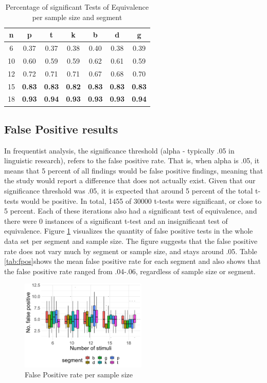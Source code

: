 \documentclass[
  a4paper,
  11pt,
  twocolumn]{article}
\begin{document}
\begin{table}[!ht]
  \caption{Percentage of significant Tests of Equivalence per sample size and segment}
  \label{tab:nums}
  \begin{center}
  \begin{tabular}{|c|c|c|c|c|c|c|}
  \hline
  \rowcolor[gray]{.75}
  n & p & t & k & b & d & g  \\
  \hline
  6 & 0.37 & 0.37 & 0.38 & 0.40 & 0.38 & 0.39 \\ 
  10 & 0.60 & 0.59 & 0.59 & 0.62 & 0.61 & 0.59 \\ 
  12 & 0.72 & 0.71 & 0.71 & 0.67 & 0.68 & 0.70 \\ 
  15 & \textbf{0.83} & \textbf{0.83} & \textbf{0.82} & \textbf{0.83} & \textbf{0.83} & \textbf{0.83} \\ 
  18 & \textbf{0.93} & \textbf{0.94} & \textbf{0.93} & \textbf{0.93} & \textbf{0.93} & \textbf{0.94} \\ 
  \hline
  \end{tabular}
  \end{center}
\end{table}

\subsection{False Positive results}

In frequentist analysis, the significance threshold (alpha - typically
.05 in linguistic research), refers to the false positive rate. That is,
when alpha is .05, it means that 5 percent of all findings would be
false positive findings, meaning that the study would report a
difference that does not actually exist. Given that our significance
threshold was .05, it is expected that around 5 percent of the total
t-tests would be positive. In total, 1455 of 30000 t-tests were
significant, or close to 5 percent. Each of these iterations also had a
significant test of equivalence, and there were 0 instances of a
significant t-test and an insignificant test of equivalence. Figure
\ref{fig:fprate} visualizes the quantity of false positive tests in the
whole data set per segment and sample size. The figure suggests that the
false positive rate does not vary much by segment or sample size, and
stays around .05. Table \ref{tab:fpos}shows the mean false positive rate
for each segment and also shows that the false positive rate ranged from
.04-.06, regardless of sample size or segment.

\begin{figure}[!ht]
  \caption{False Positive rate per sample size}
  \label{fig:fprate}
  \begin{center}
  \includegraphics[width=6cm]{./includes/figures/fp_tost.png}
  \end{center}
\end{figure}
\end{document}
